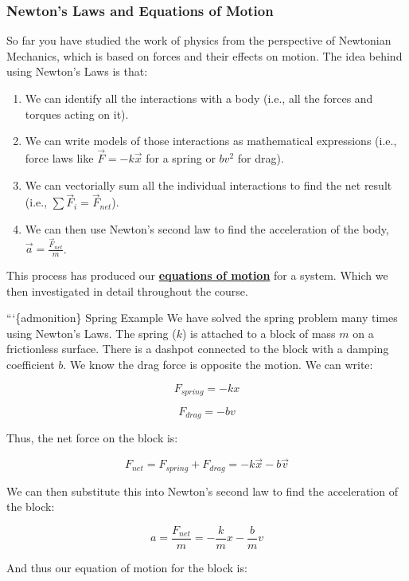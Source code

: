 \documentclass[11pt]{article}
\providecommand{\tightlist}{%
      \setlength{\itemsep}{0pt}\setlength{\parskip}{0pt}}
\begin{document}
    \subsubsection{Newton's Laws and Equations of
Motion}\label{newtons-laws-and-equations-of-motion}

So far you have studied the work of physics from the perspective of
Newtonian Mechanics, which is based on forces and their effects on
motion. The idea behind using Newton's Laws is that:

\begin{enumerate}
\def\labelenumi{\arabic{enumi}.}
\tightlist
\item
  We can identify all the interactions with a body (i.e., all the forces
  and torques acting on it).
\item
  We can write models of those interactions as mathematical expressions
  (i.e., force laws like \(\vec{F} = -k \vec{x}\) for a spring or
  \(b v^2\) for drag).
\item
  We can vectorially sum all the individual interactions to find the net
  result (i.e., \(\sum \vec{F}_i = \vec{F}_{net}\)).
\item
  We can then use Newton's second law to find the acceleration of the
  body, \(\vec{a} = \frac{\vec{F}_{net}}{m}\).
\end{enumerate}

This process has produced our
\textbf{\href{https://en.wikipedia.org/wiki/Equation_of_motion}{equations
of motion}} for a system. Which we then investigated in detail
throughout the course.

```\{admonition\} Spring Example We have solved the spring problem many
times using Newton's Laws. The spring (\(k\)) is attached to a block of
mass \(m\) on a frictionless surface. There is a dashpot connected to
the block with a damping coefficient \(b\). We know the drag force is
opposite the motion. We can write:

\[F_{spring} = -k x\]

\[F_{drag} = -b v\]

Thus, the net force on the block is:

\[F_{net} = F_{spring} + F_{drag} = -k \vec{x} - b \vec{v}\]

We can then substitute this into Newton's second law to find the
acceleration of the block:

\[a = \frac{F_{net}}{m} = -\frac{k}{m} x - \frac{b}{m} v\]

And thus our equation of motion for the block is:
\end{document}
